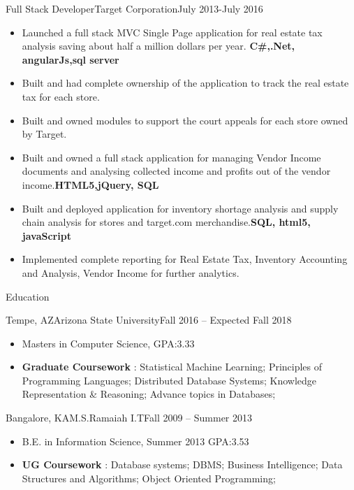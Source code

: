 \documentclass[]{nakulcv}
\begin{document}
	\begin{cvsubsection}{Full Stack Developer}{Target Corporation}{July 2013-July 2016}
		\begin{itemize}
			\item Launched a full stack MVC Single Page application for real estate tax analysis saving about half a million dollars per year. \textbf{C\#,.Net, angularJs,sql server}
			\item Built and had complete ownership of the application to track the real estate tax for each store.
			\item Built and owned modules to support the court appeals for each store owned by Target.
			\item Built and owned a full stack application for managing Vendor Income documents and analysing collected income and profits out of the vendor income.\textbf{HTML5,jQuery, SQL}
			\item Built and deployed application for inventory shortage analysis and supply chain analysis for stores and target.com merchandise.\textbf{SQL, html5, javaScript}
			\item Implemented complete reporting for Real Estate Tax, Inventory Accounting and Analysis, Vendor Income for further analytics.
		\end{itemize}
	\end{cvsubsection}
\begin{cvsection}{Education}
	\begin{cvsubsection}{Tempe, AZ}{Arizona State University}{Fall 2016 -- Expected Fall 2018}
		\begin{itemize}
			\item Masters in Computer Science, GPA:3.33
			\item \textbf{Graduate Coursework} : Statistical Machine Learning; Principles of Programming Languages; Distributed Database Systems; Knowledge Representation \& Reasoning; Advance topics in Databases;
		\end{itemize}
	\end{cvsubsection}

	\begin{cvsubsection}{Bangalore, KA}{M.S.Ramaiah I.T}{Fall 2009 -- Summer 2013}
		\begin{itemize}
			\item B.E. in Information Science, Summer 2013 GPA:3.53
			\item \textbf{UG Coursework} : Database systems; DBMS; Business Intelligence; Data Structures and Algorithms; Object Oriented Programming;
		\end{itemize}
	\end{cvsubsection}

\end{cvsection}
\end{document}
